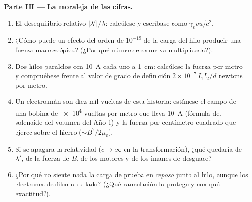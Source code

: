 \begin{problem}
\medskip\noindent\textbf{Parte III --- La moraleja de las cifras.}
\begin{enumerate}[resume]
  \item El desequilibrio relativo $|\lambda'|/\lambda$: calcúlese y
        escríbase como $\gamma_v vu/c^2$.
  \item ¿Cómo puede un efecto del orden de $10^{-19}$ de la carga del
        hilo producir una fuerza macroscópica? (¿Por qué número enorme
        va multiplicado?).
  \item Dos hilos paralelos con \qty{10}{A} cada uno a \qty{1}{cm}:
        calcúlese la fuerza por metro y compruébese frente al valor de
        grado de definición $2 \times 10^{-7}\,I_1I_2/d$ newtons por
        metro.
  \item Un electroimán son diez mil vueltas de esta historia: estímese el
        campo de una bobina de \qty{e4}{} vueltas por metro que lleva
        \qty{10}{A} (fórmula del solenoide del volumen del Año 1) y la
        fuerza por centímetro cuadrado que ejerce sobre el hierro
        ($\sim B^2/2\mu_0$).
  \item Si se apagara la relatividad ($c \to \infty$ en la
        transformación), ¿qué quedaría de $\lambda'$, de la fuerza de
        $B$, de los motores y de los imanes de desguace?
  \item ¿Por qué no siente nada la carga de prueba en \emph{reposo}
        junto al hilo, aunque los electrones desfilen a su lado? (¿Qué
        cancelación la protege y con qué exactitud?).
\end{enumerate}


\end{problem}
